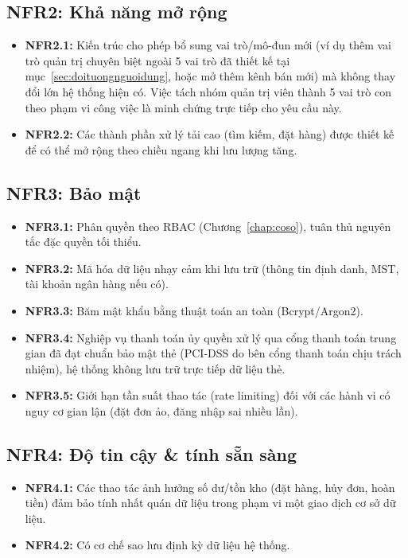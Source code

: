 \subsection{NFR2: Khả năng mở rộng}
\begin{itemize}
    \item \textbf{NFR2.1:} Kiến trúc cho phép bổ sung vai trò/mô-đun mới
    (ví dụ thêm vai trò quản trị chuyên biệt ngoài 5 vai trò đã thiết kế tại
    mục~\ref{sec:doituongnguoidung}, hoặc mở thêm kênh bán mới) mà không
    thay đổi lớn hệ thống hiện có. Việc tách nhóm quản trị viên thành 5 vai
    trò con theo phạm vi công việc là minh chứng trực tiếp cho yêu cầu này.
    \item \textbf{NFR2.2:} Các thành phần xử lý tải cao (tìm kiếm, đặt
    hàng) được thiết kế để có thể mở rộng theo chiều ngang khi lưu lượng
    tăng.
\end{itemize}

\subsection{NFR3: Bảo mật}
\begin{itemize}
    \item \textbf{NFR3.1:} Phân quyền theo RBAC (Chương~\ref{chap:coso}), tuân
    thủ nguyên tắc đặc quyền tối thiểu.
    \item \textbf{NFR3.2:} Mã hóa dữ liệu nhạy cảm khi lưu trữ (thông tin
    định danh, MST, tài khoản ngân hàng nếu có).
    \item \textbf{NFR3.3:} Băm mật khẩu bằng thuật toán an toàn
    (Bcrypt/Argon2).
    \item \textbf{NFR3.4:} Nghiệp vụ thanh toán ủy quyền xử lý qua cổng
    thanh toán trung gian đã đạt chuẩn bảo mật thẻ (PCI-DSS do bên cổng
    thanh toán chịu trách nhiệm), hệ thống không lưu trữ trực tiếp dữ liệu
    thẻ.
    \item \textbf{NFR3.5:} Giới hạn tần suất thao tác (rate limiting) đối
    với các hành vi có nguy cơ gian lận (đặt đơn ảo, đăng nhập sai nhiều
    lần).
\end{itemize}

\subsection{NFR4: Độ tin cậy \& tính sẵn sàng}
\begin{itemize}
    \item \textbf{NFR4.1:} Các thao tác ảnh hưởng số dư/tồn kho (đặt hàng,
    hủy đơn, hoàn tiền) đảm bảo tính nhất quán dữ liệu trong phạm vi một
    giao dịch cơ sở dữ liệu.
    \item \textbf{NFR4.2:} Có cơ chế sao lưu định kỳ dữ liệu hệ thống.
\end{itemize}

